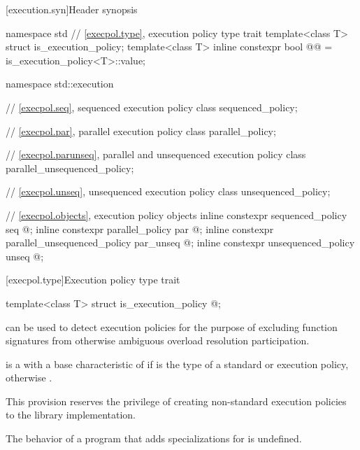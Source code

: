 [execution.syn]{Header  synopsis}

%
\begin{codeblock}
namespace std {
  // \ref{execpol.type}, execution policy type trait
  template<class T> struct is_execution_policy;
  template<class T> inline constexpr bool @@ = is_execution_policy<T>::value;
}

namespace std::execution {
  // \ref{execpol.seq}, sequenced execution policy
  class sequenced_policy;

  // \ref{execpol.par}, parallel execution policy
  class parallel_policy;

  // \ref{execpol.parunseq}, parallel and unsequenced execution policy
  class parallel_unsequenced_policy;

  // \ref{execpol.unseq}, unsequenced execution policy
  class unsequenced_policy;

  // \ref{execpol.objects}, execution policy objects
  inline constexpr sequenced_policy            seq{ @\unspec@ };
  inline constexpr parallel_policy             par{ @\unspec@ };
  inline constexpr parallel_unsequenced_policy par_unseq{ @\unspec@ };
  inline constexpr unsequenced_policy          unseq{ @\unspec@ };
}
\end{codeblock}

[execpol.type]{Execution policy type trait}

%
\begin{itemdecl}
template<class T> struct is_execution_policy { @\seebelow@ };
\end{itemdecl}

\begin{itemdescr}
\pnum
{} can be used to detect execution policies for the
purpose of excluding function signatures from otherwise ambiguous overload
resolution participation.

\pnum
{} is a  with a
base characteristic of  if  is the type of a standard
or 
execution policy, otherwise .

\begin{note}
This provision reserves the privilege of creating non-standard execution
policies to the library implementation.
\end{note}

\pnum
The behavior of a program that adds specializations for
 is undefined.
\end{itemdescr}

